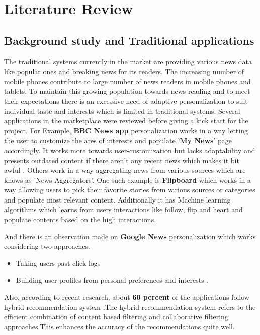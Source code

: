 \chapter{Literature Review}

\label{ch:background} 

\section {Background study and Traditional applications}
The traditional systems currently in the market are providing various news data like popular ones and breaking news for its readers. The increasing number of mobile phones contribute to large number of news readers in mobile phones and tablets. To maintain this growing population towards news-reading and to meet their expectations there is an excessive need of adaptive personalization to suit individual taste and interests which is limited in traditional systems.\newline
Several applications in the marketplace were reviewed before giving a kick start for the project. For Example, \textbf{BBC News app} personalization works in a way letting the user to customize the ares of interests and populate '\textbf{My News}' page accordingly. It works more towards user-customization but lacks adaptability and presents outdated content if there aren't any recent news which makes it bit awful \cite{gitsham_2015}.\newline
Others work in a way aggregating news from various sources which are knows as 'News Aggregators'. One such example is \textbf{Flipboard} which works in a way allowing users to pick their favorite stories from various sources or categories and populate most relevant content. Additionally it has Machine learning algorithms which learns from users interactions like follow, flip and heart and populate contents based on the high interactions\cite{anne_2018}. \newline

And there is an observation made on \textbf{Google News} personalization which works considering two approaches. 
\begin{itemize}
    \item Taking users past click logs 
    \item Building user profiles from personal preferences and interests \cite{googlenews}.
\end{itemize}
Also, according to recent research, about \textbf{60 percent} of the applications follow hybrid recommendation system \cite{recommend_2020}.The hybrid recommendation system refers to the efficient combination of content based filtering and collaborative filtering approaches.This enhances the accuracy of the recommendations quite well\cite{Jonnalagedda_2016}.\newline

